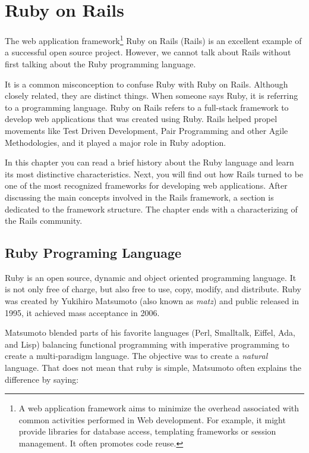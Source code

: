 \thispagestyle{empty}
\chapter{Ruby on Rails}\label{chap:ruby_on_rails}

The \textsf{web application framework}\footnote{
  A web application framework aims to minimize the overhead associated with common activities performed in Web development. 
  For example, it might provide libraries for database access, templating frameworks or session management. 
  It often promotes code reuse.
} Ruby on Rails (Rails) is an excellent example of a successful open source project.
However, we cannot talk about Rails without first talking about the Ruby programming language.

It is a common misconception to confuse Ruby with Ruby on Rails. 
Although closely related, they are distinct things.
When someone says Ruby, it is referring to a programming language.
Ruby on Rails refers to a full-stack framework to develop web applications that was created using Ruby.
Rails helped propel movements like 
Test Driven Development, Pair Programming and other Agile Methodologies, 
and it played a major role in Ruby adoption. 

In this chapter you can read a brief history about the Ruby language
and learn its most distinctive characteristics.
Next, you will find out how Rails turned to be one of the 
most recognized frameworks for developing web applications.
After discussing the main concepts involved in the Rails framework, 
a section is dedicated to the framework structure. 
The chapter ends with a characterizing of the Rails community. 



\section{Ruby Programing Language} 
Ruby is an open source, dynamic and object oriented programming language.
It is not only free of charge, but also free to use, copy, modify, and distribute.
Ruby was created by Yukihiro Matsumoto (also known as \emph{matz}) and public released in 1995, 
it achieved mass acceptance in 2006.

Matsumoto blended parts of his favorite languages (Perl, Smalltalk, Eiffel, Ada, and Lisp) 
balancing functional programming with imperative programming 
to create a multi-paradigm language. 
The objective was to create a \emph{natural} language. 
That does not mean that ruby is simple, Matsumoto often explains the difference by saying:

